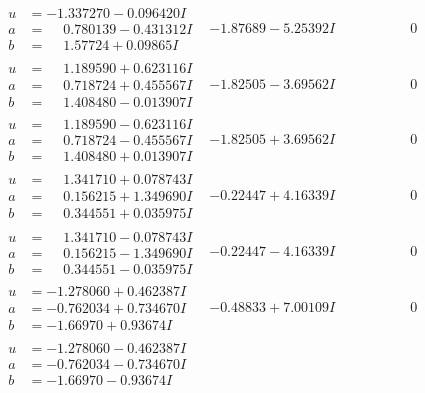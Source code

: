 \documentclass[1p]{elsarticle_modified}
\theoremstyle{definition}
\begin{document}
$$\begin{array}{c|c|c}
\begin{aligned}
u &= -1.337270 - 0.096420 I \\
a &= \phantom{-}0.780139 - 0.431312 I \\
b &= \phantom{-}1.57724 + 0.09865 I\end{aligned}
 & -1.87689 - 5.25392 I & \phantom{-0.000000 } 0 \\ \hline\begin{aligned}
u &= \phantom{-}1.189590 + 0.623116 I \\
a &= \phantom{-}0.718724 + 0.455567 I \\
b &= \phantom{-}1.408480 - 0.013907 I\end{aligned}
 & -1.82505 - 3.69562 I & \phantom{-0.000000 } 0 \\ \hline\begin{aligned}
u &= \phantom{-}1.189590 - 0.623116 I \\
a &= \phantom{-}0.718724 - 0.455567 I \\
b &= \phantom{-}1.408480 + 0.013907 I\end{aligned}
 & -1.82505 + 3.69562 I & \phantom{-0.000000 } 0 \\ \hline\begin{aligned}
u &= \phantom{-}1.341710 + 0.078743 I \\
a &= \phantom{-}0.156215 + 1.349690 I \\
b &= \phantom{-}0.344551 + 0.035975 I\end{aligned}
 & -0.22447 + 4.16339 I & \phantom{-0.000000 } 0 \\ \hline\begin{aligned}
u &= \phantom{-}1.341710 - 0.078743 I \\
a &= \phantom{-}0.156215 - 1.349690 I \\
b &= \phantom{-}0.344551 - 0.035975 I\end{aligned}
 & -0.22447 - 4.16339 I & \phantom{-0.000000 } 0 \\ \hline\begin{aligned}
u &= -1.278060 + 0.462387 I \\
a &= -0.762034 + 0.734670 I \\
b &= -1.66970 + 0.93674 I\end{aligned}
 & -0.48833 + 7.00109 I & \phantom{-0.000000 } 0 \\ \hline\begin{aligned}
u &= -1.278060 - 0.462387 I \\
a &= -0.762034 - 0.734670 I \\
b &= -1.66970 - 0.93674 I\end{aligned}

\end{array}$$
\end{document}
